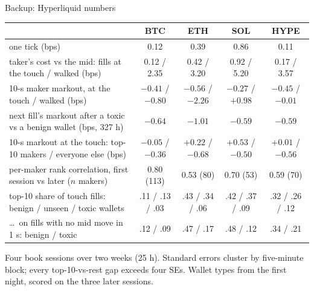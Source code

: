 \documentclass[aspectratio=169,9pt]{beamer}
\begin{document}
\begin{frame}{Backup: Hyperliquid numbers}
\scriptsize
\begin{tabular}{lcccc}
\toprule
 & BTC & ETH & SOL & HYPE \\
\midrule
one tick (bps) & 0.12 & 0.39 & 0.86 & 0.11 \\
taker's cost vs the mid: fills at the touch / walked (bps) & 0.12 / 2.35 & 0.42 / 3.20 & 0.92 / 5.20 & 0.17 / 3.57 \\
10-s maker markout, at the touch / walked (bps) & $-0.41$ / $-0.80$ & $-0.56$ / $-2.26$ & $-0.27$ / $+0.98$ & $-0.45$ / $-0.01$ \\
next fill's markout after a toxic vs a benign wallet (bps, 327 h) & $-0.64$ & $-1.01$ & $-0.59$ & $-0.59$ \\
10-s markout at the touch: top-10 makers / everyone else (bps) & $-0.05$ / $-0.36$ & $+0.22$ / $-0.68$ & $+0.53$ / $-0.50$ & $+0.01$ / $-0.56$ \\
per-maker rank correlation, first session vs later ($n$ makers) & 0.80 (113) & 0.53 (80) & 0.70 (53) & 0.59 (70) \\
top-10 share of touch fills: benign / unseen / toxic wallets & .11 / .13 / .03 & .43 / .34 / .06 & .42 / .37 / .09 & .32 / .26 / .12 \\
\ldots\ on fills with no mid move in 1 s: benign / toxic & .12 / .09 & .47 / .17 & .48 / .12 & .34 / .21 \\
\bottomrule
\end{tabular}
\vspace{4pt}

Four book sessions over two weeks (25 h). Standard errors cluster by five-minute block; every top-10-vs-rest gap exceeds four SEs. Wallet types from the first night, scored on the three later sessions.
\end{frame}
\end{document}
